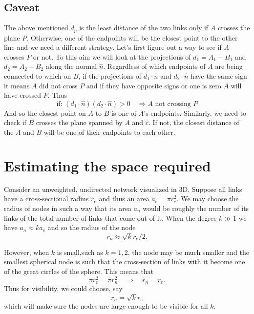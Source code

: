 \documentclass[nofootinbib,preprint,floatfix,titlepage,endfloats,superscriptaddress]{revtex4} %
\begin{document}
\subsection{Caveat}
The above mentioned $d_p$ is the least distance of the two links only if $A$ crosses the plane $P$. Otherwise, one of the endpoints will be the closest point to the other line and we need a different strategy. Let's first figure out a way to see if $A$ crosses $P$ or not. To this aim we will look at the projections of $d_1= A_1-B_1$ and $d_2 = A_2 - B_2$ along the normal $\hat{n} $. Regardless of which endpoints of $A$ are being connected to which on $B$, if the projections of $d_1\cdot \hat{n}$ and $d_2\cdot \hat{n} $ have the same sign it means $A$ did not cross $P$ and if they have opposite signs or one is zero $A$ will have crossed $P$. Thus  
\[\mbox{if: } (d_1\cdot \hat{n})(d_2\cdot \hat{n}) >0 \quad \Rightarrow  A\mbox{ not crossing }P\]
And so the closest point on $A$ to $B$ is one of $A$'s endpoints. Similarly, we need to check if $B$ crosses the plane spanned by $A$ and $\hat{c}$. If not, the closest distance of the $A$ and $B$ will be one of their endpoints to each other. 



\section{Estimating the space required}
Consider an unweighted, undirected network visualized in 3D.  
Suppose all links have a cross-sectional radius $ r_e$ and thus an area $a_e = \pi r_e^2$. We may choose the radius of nodes in such a way that its area $a_n$ would be roughly the number of its links  of the total number of links that come out of it. When the degree $k\gg 1$ we have $a_n \approx k a_e$ and so the radius of the node $$r_n \approx \sqrt{k}r_e/2.$$ 

However, when $k$ is small,such as $k =1,2$, the node may be much smaller and the smallest spherical node is such that the cross-section of links with it become one of the great circles of the sphere. This means that 
$$ \pi r_e^2 = \pi r_n^2  \quad \Rightarrow \quad  r_n = r_e.$$
Thus for visibility, we could choose, say 
$$r_n = \sqrt{k} r_e$$
which will make sure the nodes are large enough to be visible for all $k$. 
\end{document}
